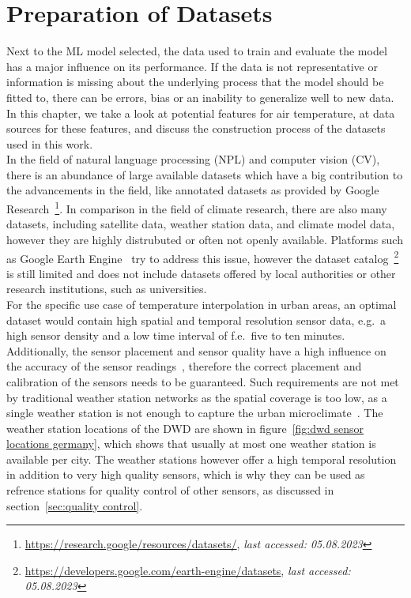 \chapter{Preparation of Datasets}
\label{chap:preparations data sets}

Next to the ML model selected, the data used to train and evaluate the model has a major influence on its performance. If the data is not representative or information is missing about the underlying process that the model should be fitted to, there can be errors, bias or an inability to generalize well to new data. In this chapter, we take a look at potential features for air temperature, at data sources for these features, and discuss the construction process of the datasets used in this work.\\
In the field of natural language processing (NPL) and computer vision (CV), there is an abundance of large available datasets which have a big contribution to the advancements in the field, like annotated datasets as provided by Google Research~\footnote{\url{https://research.google/resources/datasets/}, \textit{last accessed: 05.08.2023}}. In comparison in the field of climate research, there are also many datasets, including satellite data, weather station data, and climate model data, however they are highly distrubuted or often not openly available. Platforms such as Google Earth Engine~\cite{gorelick2017google} try to address this issue, however the dataset catalog~\footnote{\url{https://developers.google.com/earth-engine/datasets}, \textit{last accessed: 05.08.2023}} is still limited and does not include datasets offered by local authorities or other research institutions, such as universities.\\
For the specific use case of temperature interpolation in urban areas, an optimal dataset would contain high spatial and temporal resolution sensor data, e.g.\ a high sensor density and a low time interval of f.e.\ five to ten minutes. Additionally, the sensor placement and sensor quality have a high influence on the accuracy of the sensor readings~\cite{oke2006guideline}, therefore the correct placement and calibration of the sensors needs to be guaranteed. Such requirements are not met by traditional weather station networks as the spatial coverage is too low, as a single weather station is not enough to capture the urban microclimate~\cite{oke2017urban}. The weather station locations of the DWD are shown in figure~\ref{fig:dwd sensor locations germany}, which shows that usually at most one weather station is available per city. The weather stations however offer a high temporal resolution in addition to very high quality sensors, which is why they can be used as refrence stations for quality control of other sensors, as discussed in section~\ref{sec:quality control}.\\
